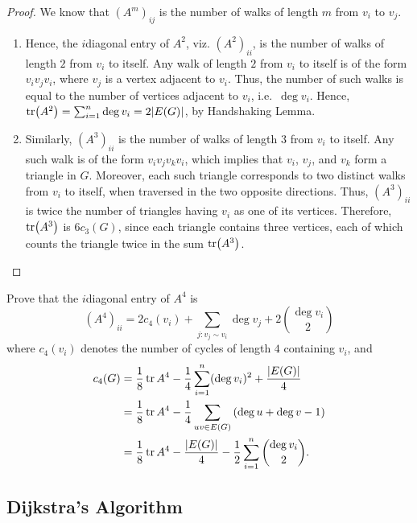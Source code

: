 \begin{proof}
We know that $(A^m)_{ij}$ is the number of walks of length $m$ from $v_i$ to $v_j$.
\begin{enumerate}[label=(\roman*)]
\item Hence, the $i$\nth diagonal entry of $A^2$, viz. $(A^2)_{ii}$, is the number of walks of length $2$ from $v_i$ to itself. Any walk of length $2$ from $v_i$ to itself is of the form $v_i v_j v_i$, where $v_j$ is a vertex adjacent to $v_i$. Thus, the number of such walks is equal to the number of vertices adjacent to $v_i$, i.e.\ $\deg v_i$. Hence, $\tr(A^2) = \sum_{i=1}^n \deg v_i = 2|E(G)|$, by Handshaking Lemma.

\item Similarly, $(A^3)_{ii}$ is the number of walks of length $3$ from $v_i$ to itself. Any such walk is of the form $v_i v_j v_k v_i$, which implies that $v_i$, $v_j$, and $v_k$ form a triangle in $G$. Moreover, each such triangle corresponds to two distinct walks from $v_i$ to itself, when traversed in the two opposite directions. Thus, $(A^3)_{ii}$ is twice the number of triangles having $v_i$ as one of its vertices. Therefore, $\tr(A^3)$ is $6 c_3(G)$, since each triangle contains three vertices, each of which counts the triangle twice in the sum $\tr(A^3)$. \qedhere
\end{enumerate}
\end{proof}

\begin{Exercise}
Prove that the $i$\nth diagonal entry of $A^4$ is
\begin{equation*}
(A^4)_{ii} = 2c_4(v_i) + \sum_{j \colon v_j \sim v_i} \deg v_j + 2 \binom{\deg v_i}{2}
\end{equation*}
where $c_4(v_i)$ denotes the number of cycles of length $4$ containing $v_i$, and
\begin{align*}
c_4(G) & = \frac 1 8 \tr A^4 - \frac 1 4 \sum_{i=1}^{n} (\deg v_i)^2 + \frac{|E(G)|}{4} \\
& = \frac 1 8 \tr A^4 - \frac 1 4 \sum_{uv \in E(G)} \pqty{\deg u + \deg v - 1} \\
& = \frac 1 8 \tr A^4 - \frac {|E(G)|} 4 - \frac 1 2 \sum_{i=1}^n \binom {\deg v_i} 2.
\end{align*}
\end{Exercise}

\subsection{Dijkstra's Algorithm}\label{subsec:Dijkstra}

